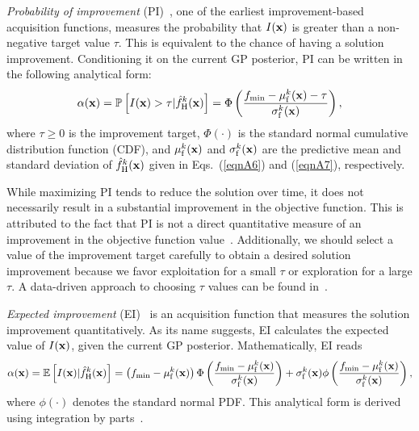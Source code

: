 \documentclass[journal ]{new-aiaa}
\newcommand{\edit}[1]{\textcolor{red!80!black}{#1}} %
\begin{document}
	\textit{Probability of improvement} (PI)~\citep{Kushner1964}, one of the earliest improvement-based acquisition functions, measures the probability that $I({\bf x})$ is greater than a non-negative target value $\tau$.
	This is equivalent to the chance of having a solution improvement.
	Conditioning it on the current GP posterior, PI can be written in the following analytical form:
	\begin{equation}\label{eqn38}
		\alpha({\bf x}) = \mathbb{P}\left[I({\bf x})>\tau|\hat{f}_\text{H}^k({\bf x})\right]=\Phi\left(\frac{f_\text{min}-\mu_\text{f}^k({\bf x})-\tau}{\sigma_\text{f}^k({\bf x})}\right),
	\end{equation}
	where %
	{$\tau \geq 0$ is the improvement target}, $\Phi(\cdot)$ is the standard normal cumulative distribution function (CDF), and $\mu_\text{f}^k({\bf x})$ and $\sigma_\text{f}^k({\bf x})$ are the predictive mean and standard deviation of $\hat{f}_\text{H}^k({\bf x})$ given in Eqs.~(\ref{eqnA6}) and (\ref{eqnA7}), respectively.
	
	While maximizing PI tends to reduce the solution over time, it does not necessarily result in a substantial improvement in the objective function.
	This is attributed to the fact that PI is not a direct quantitative measure of an improvement in the objective function value~\citep{Kochenderfer2019}.
	{Additionally, we should select a value of the improvement target carefully to obtain a desired solution improvement because we favor exploitation for a small $\tau$ or exploration for a large $\tau$.
		A data-driven approach to choosing $\tau$ values can be found in~\citet{Jones2001}.}
	
	\textit{Expected improvement} (EI)~\citep{Mockus1975,Jones1998} is an acquisition function that measures the solution improvement quantitatively.
	As its name suggests, EI calculates the expected value of $I({\bf x})$, given the current GP posterior.
	Mathematically, EI reads
	\begin{equation}\label{eqn39}
		\alpha({\bf x})  = \mathbb{E}\left[I({\bf x})|\hat{f}_\text{H}^k({\bf x})\right]
		=\left( f_\text{min}-\mu_\text{f}^k({\bf x})\right)\Phi\left(\frac{f_\text{min}-\mu_\text{f}^k({\bf x})}{\sigma_\text{f}^k({\bf x})}\right)
		+\sigma_\text{f}^k({\bf x})\phi\left(\frac{f_\text{min}-\mu_\text{f}^k({\bf x})}{\sigma_\text{f}^k({\bf x})}\right),
	\end{equation}
	where $\phi(\cdot)$ denotes the standard normal PDF.
	This analytical form is derived using integration by parts~\citep{Jones1998,Kochenderfer2019}.
	
\end{document}
